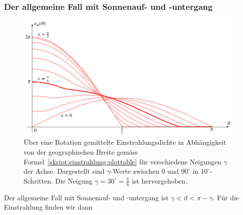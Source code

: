 \subsubsection{Der allgemeine Fall mit Sonnenauf- und -untergang}
\begin{figure}
\centering
\includegraphics{chapters/5/ein.pdf}
\caption{Über eine Rotation gemittelte Einstrahlungsdichte
in Abhängigkeit von der geographischen Breite
gemäss Formel~\eqref{skript:einstrahlung:plottable} für verschiedene
Neigungen $\gamma$ der Achse. 
Dargestellt sind $\gamma$-Werte zwischen 0 und $90^\circ$ 
in $10^\circ$-Schritten. 
Die Neigung $\gamma=30^\circ=\frac{\pi}{6}$ ist hervorgehoben.
\label{skript:einstrahlung:ein}}
\end{figure}%
Der allgemeine Fall mit Sonnenauf- und -untergang
ist $\gamma < \vartheta < \pi-\gamma$.
Für die Einstrahlung finden wir dann

